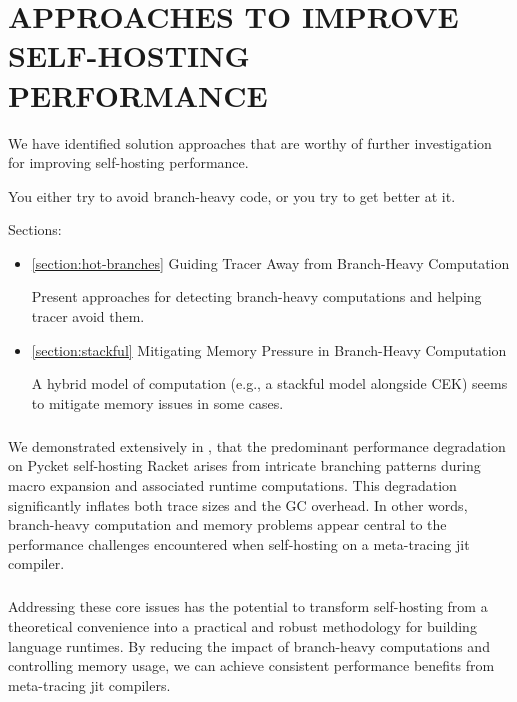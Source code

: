 \chapter[\texorpdfstring{APPROACHES TO IMPROVE SELF-HOSTING PERFORMANCE}
                          {7. Improving Performance}]{APPROACHES TO IMPROVE SELF-HOSTING PERFORMANCE}

	\label{chapter:solution}

  \begin{chaptersynopsis}\footnotesize
    \footnotesize

    We have identified solution approaches that are worthy of further investigation for improving self-hosting performance.

    You either try to avoid branch-heavy code, or you try to get better at it.

    Sections:
		\begin{itemize}
			\item \ref{section:hot-branches} Guiding Tracer Away from Branch-Heavy Computation

				Present approaches for detecting branch-heavy computations and helping tracer avoid them.
			\item \ref{section:stackful} Mitigating Memory Pressure in Branch-Heavy Computation

				A hybrid model of computation (e.g., a stackful model alongside CEK) seems to mitigate memory issues in some cases.
		\end{itemize}
  \end{chaptersynopsis}

  \paragraph{}%
    We demonstrated extensively in , that the predominant performance degradation on Pycket self-hosting Racket arises from intricate branching patterns during macro expansion and associated runtime computations. This degradation significantly inflates both trace sizes and the GC overhead. In other words, branch-heavy computation and memory problems appear central to the performance challenges encountered when self-hosting on a meta-tracing \gls{jit} compiler.

  \paragraph{}%
    Addressing these core issues has the potential to transform self-hosting from a theoretical convenience into a practical and robust methodology for building language runtimes. By reducing the impact of branch-heavy computations and controlling memory usage, we can achieve consistent performance benefits from meta-tracing \gls{jit} compilers.

